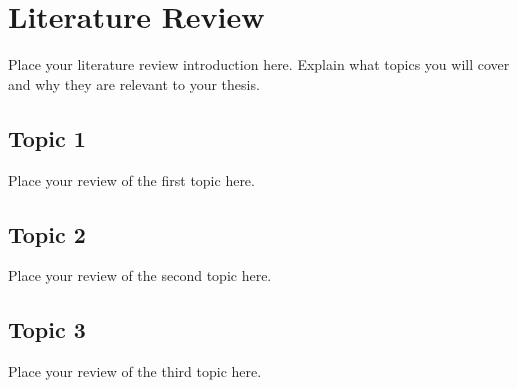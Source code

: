 \chapter{Literature Review}



Place your literature review introduction here. Explain what topics you will cover and why they are relevant to your thesis.

\section{Topic 1} \label{chapter2:section:topic1}


Place your review of the first topic here.


\section{Topic 2}


Place your review of the second topic here.

\section{Topic 3}


Place your review of the third topic here.


